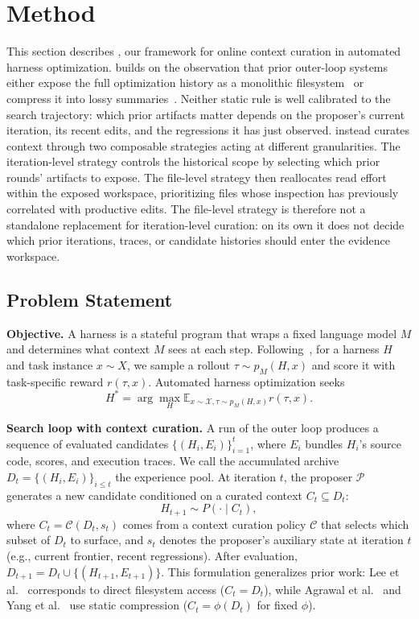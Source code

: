 \section{Method}
\label{sec:method}
This section describes \name, our framework for online context curation in
automated harness optimization. \name builds on the observation that prior outer-loop systems either expose
the full optimization history as a monolithic
filesystem~\cite{lee2026metaharness} or compress it into lossy
summaries~\cite{yang2024opro,lee2025feedback,agrawal2025gepa}. Neither static
rule is well calibrated to the search trajectory: which prior artifacts
matter depends on the proposer's current iteration, its recent edits, and
the regressions it has just observed. \name
instead curates context through two composable strategies acting at different
granularities. The iteration-level strategy controls the historical scope by
selecting which prior rounds' artifacts to expose. The file-level strategy
then reallocates read effort within the exposed workspace, prioritizing files
whose inspection has previously correlated with productive edits. The
file-level strategy is therefore not a standalone replacement for
iteration-level curation: on its own it does not decide which prior
iterations, traces, or candidate histories should enter the evidence
workspace.

\subsection{Problem Statement}
\label{sec:setting}
\textbf{Objective.}
A harness is a stateful program that wraps a fixed language model $M$ and determines what context $M$ sees at each step. Following~\cite{lee2026metaharness}, for a harness $H$ and task instance $x \sim X$, we sample a rollout $\tau \sim p_M(H, x)$ and score it with task-specific reward $r(\tau, x)$. Automated harness optimization seeks
$$
H^* = \arg\max_H \mathbb{E}_{x \sim \mathcal{X}, \tau \sim p_M(H, x)} r(\tau, x).
$$

\textbf{Search loop with context curation.}
A run of the outer loop produces a sequence of evaluated candidates $\{(H_i, E_i)\}_{i=1}^t$, where $E_i$ bundles $H_i$'s source code, scores, and execution traces. We call the accumulated archive $D_t = \{(H_i, E_i)\}_{i \leq t}$ the experience pool.
At iteration $t$, the proposer $\mathcal{P}$ generates a new candidate conditioned on a curated context $C_t \subseteq D_t$:
\begin{equation}
H_{t+1} \sim P(\cdot \mid C_t),
\label{eq:search_loop}
\end{equation}
where $C_t = \mathcal{C}(D_t, s_t)$ comes from a context curation policy $\mathcal{C}$ that selects which subset of $D_t$ to surface, and $s_t$ denotes the proposer's auxiliary state at iteration $t$ (e.g., current frontier, recent regressions).
After evaluation, $D_{t+1} = D_t \cup \{(H_{t+1}, E_{t+1})\}$. This formulation generalizes prior work: Lee et al.~\cite{lee2026metaharness} corresponds to direct filesystem access ($C_t = D_t$), while Agrawal et al.~\cite{agrawal2025gepa} and Yang et al.~\cite{yang2024opro} use static compression ($C_t = \phi(D_t)$ for fixed $\phi$).

